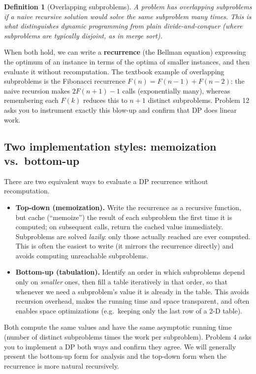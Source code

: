\documentclass[11pt]{article}
\newtheorem{definition}[theorem]{Definition}
\begin{document}
\begin{definition}[Overlapping subproblems]
A problem has \emph{overlapping subproblems} if a naive recursive solution would solve the
\emph{same} subproblem many times. This is what distinguishes dynamic programming from
plain divide-and-conquer (where subproblems are typically disjoint, as in merge sort).
\end{definition}

When both hold, we can write a \textbf{recurrence} (the Bellman equation) expressing the
optimum of an instance in terms of the optima of smaller instances, and then evaluate it
without recomputation. The textbook example of overlapping subproblems is the Fibonacci
recurrence $F(n) = F(n-1) + F(n-2)$: the naive recursion makes $2F(n+1)-1$ calls
(exponentially many), whereas remembering each $F(k)$ reduces this to $n+1$ distinct
subproblems. Problem 12 asks you to instrument exactly this blow-up and confirm that DP
does linear work.

\subsection{Two implementation styles: memoization vs.\ bottom-up}

There are two equivalent ways to evaluate a DP recurrence without recomputation.

\begin{itemize}
    \item \textbf{Top-down (memoization).} Write the recurrence as a recursive function,
    but cache (``memoize'') the result of each subproblem the first time it is computed; on
    subsequent calls, return the cached value immediately. Subproblems are solved
    \emph{lazily}: only those actually reached are ever computed. This is often the easiest
    to write (it mirrors the recurrence directly) and avoids computing unreachable
    subproblems.

    \item \textbf{Bottom-up (tabulation).} Identify an order in which subproblems depend
    only on \emph{smaller} ones, then fill a table iteratively in that order, so that
    whenever we need a subproblem's value it is already in the table. This avoids recursion
    overhead, makes the running time and space transparent, and often enables space
    optimizations (e.g.\ keeping only the last row of a 2-D table).
\end{itemize}

Both compute the same values and have the same asymptotic running time (number of distinct
subproblems times the work per subproblem). Problem 4 asks you to implement a DP both ways
and confirm they agree. We will generally present the bottom-up form for analysis and the
top-down form when the recurrence is more natural recursively.
\end{document}
